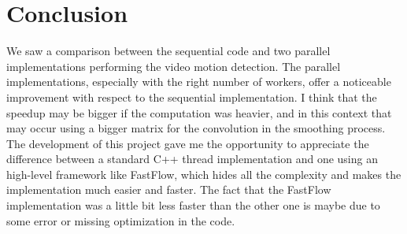 \section{Conclusion}
We saw a comparison between the sequential code and two parallel implementations performing the video motion detection.
The parallel implementations, especially with the right number of workers, offer a noticeable improvement with respect to the sequential implementation. I think that the speedup may be bigger if the computation was heavier, and in this context that may occur using a bigger matrix for the convolution in the smoothing process.\\
The development of this project gave me the opportunity to appreciate the difference between a standard C++ thread implementation and one using an high-level framework like FastFlow, which hides all the complexity and makes the implementation much easier and faster. The fact that the FastFlow implementation was a little bit less faster than the other one is maybe due to some error or missing optimization in the code.